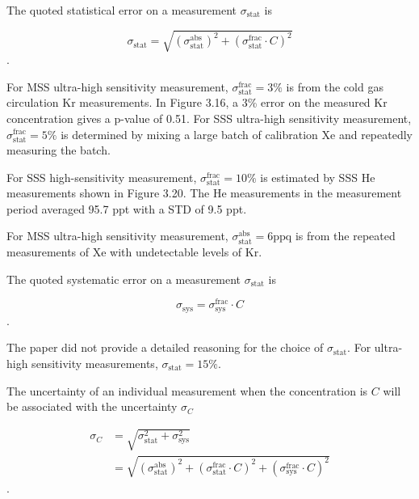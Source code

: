 \documentclass{article}
\begin{document}
The quoted statistical error on a measurement $\sigma_\mathrm{stat}$ is

\begin{equation}
    \sigma_\mathrm{stat} = \sqrt{(\sigma_\mathrm{stat}^\mathrm{abs})^2 + (\sigma_\mathrm{stat}^\mathrm{frac} \cdot C)^2}
\end{equation}.

For MSS ultra-high sensitivity measurement, $\sigma_\mathrm{stat}^\mathrm{frac} = 3\%$ is from the cold gas circulation Kr measurements. In Figure 3.16, a 3\% error on the measured Kr concentration gives a p-value of 0.51. For SSS ultra-high sensitivity measurement, $\sigma_\mathrm{stat}^\mathrm{frac} = 5\%$ is determined by mixing a large batch of calibration Xe and repeatedly measuring the batch.

For SSS high-sensitivity measurement, $\sigma_\mathrm{stat}^\mathrm{frac} = 10\%$ is estimated by SSS He measurements shown in Figure 3.20. The He measurements in the measurement period averaged 95.7 ppt with a STD of 9.5 ppt.

For MSS ultra-high sensitivity measurement, $\sigma_\mathrm{stat}^\mathrm{abs} = 6 \mathrm{ppq}$ is from the repeated measurements of Xe with undetectable levels of Kr.

The quoted systematic error on a measurement $\sigma_\mathrm{stat}$ is

\begin{equation}
    \sigma_\mathrm{sys} = \sigma_\mathrm{sys}^\mathrm{frac} \cdot C
\end{equation}.

The paper did not provide a detailed reasoning for the choice of $\sigma_\mathrm{stat}$. For ultra-high sensitivity measurements, $\sigma_\mathrm{stat} = 15\%$.

The uncertainty of an individual measurement when the concentration is $C$ will be associated with the uncertainty $\sigma_C$

\begin{align}
    \sigma_C &= \sqrt{\sigma_\mathrm{stat}^2 + \sigma_\mathrm{sys}^2} \\
    &= \sqrt{(\sigma_\mathrm{stat}^\mathrm{abs})^2 + (\sigma_\mathrm{stat}^\mathrm{frac} \cdot C)^2 + (\sigma_\mathrm{sys}^\mathrm{frac} \cdot C)^2}
\end{align}.
\end{document}
